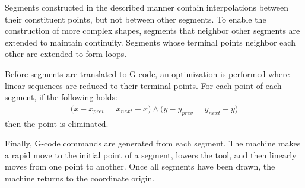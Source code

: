 Segments constructed in the described manner contain interpolations between
their constituent points, but not between other segments. To enable the
construction of more complex shapes, segments that neighbor other segments are
extended to maintain continuity. Segments whose terminal points neighbor each
other are extended to form loops.

Before segments are translated to G-code, an optimization is performed where
linear sequences are reduced to their terminal points. For each point of each
segment, if the following holds:
\begin{align*}
    \big(x - x_{prev} = x_{next} - x\big)
    \land
    \big(y - y_{prev} = y_{next} - y\big)
\end{align*}
then the point is eliminated.

Finally, G-code commands are generated from each segment. The machine makes a
rapid move to the initial point of a segment, lowers the tool, and then linearly
moves from one point to another. Once all segments have been drawn, the machine
returns to the coordinate origin.
